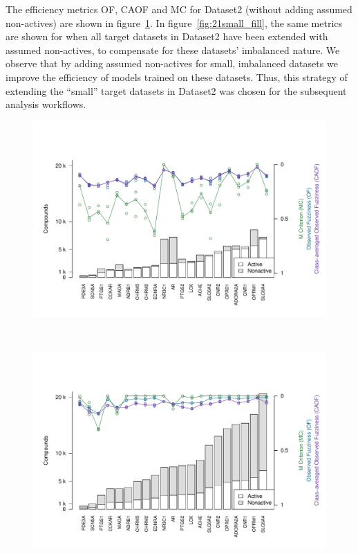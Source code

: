 \documentclass[utf8]{frontiersSCNS} %
\begin{document}
The efficiency metrics OF, CAOF and MC for Dataset2 (without adding assumed
non-actives) are shown in figure~\ref{fig:21small_orig}. In
figure~\ref{fig:21small_fill}, the same metrics are shown for when all target
datasets in Dataset2 have been extended with assumed non-actives, to compensate
for these datasets' imbalanced nature.
We observe that by adding assumed non-actives for small, imbalanced datasets we
improve the efficiency of models trained on these datasets. Thus, this strategy
of extending the ``small'' target datasets in Dataset2 was chosen for the
subsequent analysis workflows.

\begin{figure}[h!]
    \begin{minipage}[t]{0.62\textwidth}
        \setcounter{subfigure}{0} %
        \includegraphics[width=\textwidth]{figures/fig3a_21small_orig.pdf}
        \label{fig:21small_orig}
    \end{minipage} \\
    \begin{minipage}[t]{0.62\textwidth}
        \includegraphics[width=\textwidth]{figures/fig3b_21small_fill.pdf}

\end{minipage}
\end{figure}
\end{document}
